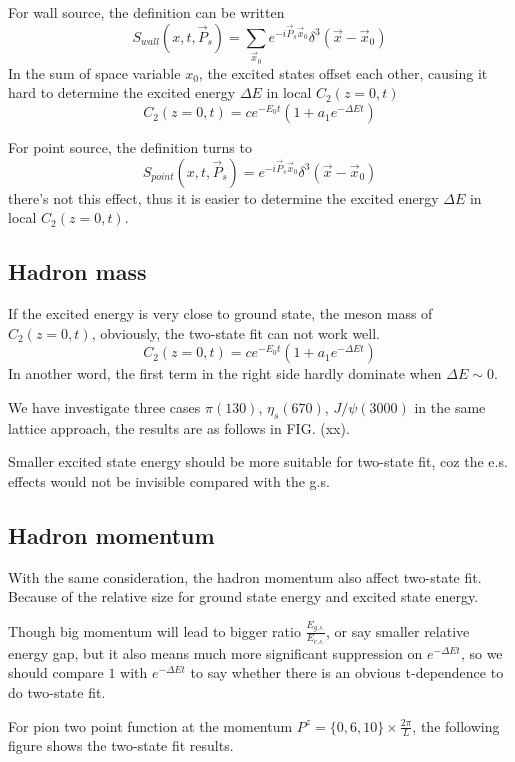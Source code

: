 \documentclass{article}
\begin{document}
For wall source, the definition can be written
\begin{displaymath}S_{wall}(x,t,\vec{P}_s)=\sum_{\vec{x}_0}e^{-i\vec{P}_s\vec{x}_0}\delta^3(\vec{x}-\vec{x}_0)\end{displaymath} 
In the sum of space variable $x_0$, the excited states offset each other, causing it hard to determine the excited energy $\Delta E$ in local $C_2(z=0,t)$
\begin{displaymath}C_2(z=0,t)=ce^{-E_0t}(1+a_1e^{-\Delta Et})\end{displaymath}

For point source, the definition turns to
\begin{displaymath}S_{point}(x,t,\vec{P}_s)=e^{-i\vec{P}_s\vec{x}_0}\delta^3(\vec{x}-\vec{x}_0)\end{displaymath} 
there's not this effect, thus it is easier to determine the excited energy $\Delta E$ in local $C_2(z=0,t)$.

\subsection{Hadron mass}
If the excited energy is very close to ground state, the meson mass of $C_2(z=0,t)$, obviously, the two-state fit can not work well.
\begin{displaymath}C_2(z=0,t)=ce^{-E_0t}(1+a_1e^{-\Delta Et})\end{displaymath}
In another word, the first term in the right side hardly dominate when $\Delta E\sim 0$.

We have investigate three cases $\pi(130)$, $\eta_s(670)$, $J/\psi(3000)$ in the same lattice approach, the results are as follows in FIG. {\color{red}(xx).}

{\color{red} Smaller excited state energy should be more suitable for two-state fit, coz the e.s. effects would not be invisible compared with the g.s. }


\subsection{Hadron momentum}
With the same consideration, the hadron momentum also affect two-state fit. Because of the relative size for ground state energy and excited state energy.

{\color{red} Though big momentum will lead to bigger ratio $\frac{E_{g.s.}}{E_{e.s.}}$, or say smaller relative energy gap, but it also means much more significant suppression on $e^{-\Delta E t}$, so we should compare $1$ with $e^{-\Delta E t}$ to say whether there is an obvious t-dependence to do two-state fit. }


For pion two point function at the momentum $P^z=\{0,6,10\}\times\frac{2\pi}{L}$, the following figure shows the two-state fit results. 
\end{document}
